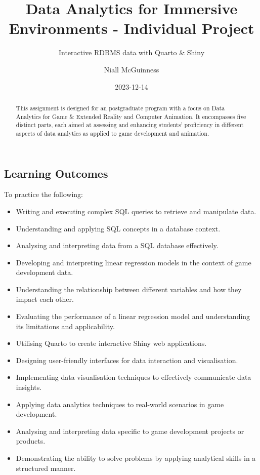 \documentclass[
  letterpaper,
  DIV=11,
  numbers=noendperiod]{scrartcl}
\title{Data Analytics for Immersive Environments - Individual Project}
\subtitle{Interactive RDBMS data with Quarto \& Shiny}
\author{Niall McGuinness}
\date{2023-12-14}
\providecommand{\tightlist}{%
  \setlength{\itemsep}{0pt}\setlength{\parskip}{0pt}}\usepackage{longtable,booktabs,array}
\renewcommand*\contentsname{Table of contents}
\newcommand\contentsname{Table of contents}
\begin{document}
\maketitle
\begin{abstract}
This assignment is designed for an postgraduate program with a focus on
Data Analytics for Game \& Extended Reality and Computer Animation. It
encompasses five distinct parts, each aimed at assessing and enhancing
students' proficiency in different aspects of data analytics as applied
to game development and animation.
\end{abstract}

\renewcommand*\contentsname{Table of contents}
{
\hypersetup{linkcolor=}
\setcounter{tocdepth}{3}
\tableofcontents
}
\subsection{Learning Outcomes}\label{learning-outcomes}

To practice the following:

\begin{itemize}
\tightlist
\item
  Writing and executing complex SQL queries to retrieve and manipulate
  data.
\item
  Understanding and applying SQL concepts in a database context.
\item
  Analysing and interpreting data from a SQL database effectively.
\item
  Developing and interpreting linear regression models in the context of
  game development data.
\item
  Understanding the relationship between different variables and how
  they impact each other.
\item
  Evaluating the performance of a linear regression model and
  understanding its limitations and applicability.
\item
  Utilising Quarto to create interactive Shiny web applications.
\item
  Designing user-friendly interfaces for data interaction and
  visualisation.
\item
  Implementing data visualisation techniques to effectively communicate
  data insights.
\item
  Applying data analytics techniques to real-world scenarios in game
  development.
\item
  Analysing and interpreting data specific to game development projects
  or products.
\item
  Demonstrating the ability to solve problems by applying analytical
  skills in a structured manner.
\end{itemize}
\end{document}
